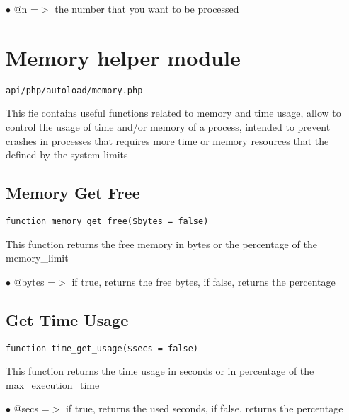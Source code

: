 \documentclass[a4paper]{book}
\begin{document}
\begin{compactitem}
\item[\color{myblue}$\bullet$] @n =$>$ the number that you want to be processed
\end{compactitem}

\hypertarget{toc200}{}
\section{Memory helper module}

\begin{lstlisting}
api/php/autoload/memory.php
\end{lstlisting}

This fie contains useful functions related to memory and time usage, allow to control the usage
of time and/or memory of a process, intended to prevent crashes in processes that requires more
time or memory resources that the defined by the system limits

\hypertarget{toc201}{}
\subsection{Memory Get Free}

\begin{lstlisting}
function memory_get_free($bytes = false)
\end{lstlisting}

This function returns the free memory in bytes or the percentage of the memory\_limit

\begin{compactitem}
\item[\color{myblue}$\bullet$] @bytes =$>$ if true, returns the free bytes, if false, returns the percentage
\end{compactitem}

\hypertarget{toc202}{}
\subsection{Get Time Usage}

\begin{lstlisting}
function time_get_usage($secs = false)
\end{lstlisting}

This function returns the time usage in seconds or in percentage of the max\_execution\_time

\begin{compactitem}
\item[\color{myblue}$\bullet$] @secs =$>$ if true, returns the used seconds, if false, returns the percentage
\end{compactitem}
\end{document}
